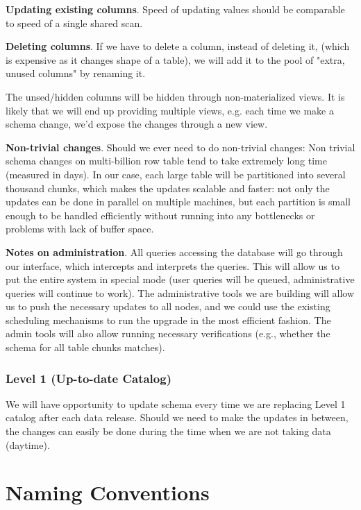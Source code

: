 \documentclass[DM,toc]{lsstdoc}
\begin{document}
\textbf{Updating existing columns}. Speed of updating values should be comparable to speed of a single shared scan.

\textbf{Deleting columns}. If we have to delete a column, instead of deleting it, (which is expensive as it changes shape of a table), we will add it to the pool of "extra, unused columns" by renaming it.

The unsed/hidden columns will be hidden through non-materialized views. It is likely that we will end up providing multiple views, e.g. each time we make a schema change, we'd expose the changes through a new view.

\textbf{Non-trivial changes}. Should we ever need to do non-trivial changes: Non trivial schema changes on multi-billion row table tend to take extremely long time (measured in days). In our case, each large table will be partitioned into several thousand chunks, which makes the updates scalable and faster: not only the updates can be done in parallel on multiple machines, but each partition is small enough to be handled efficiently without running into any bottlenecks or problems with lack of buffer space.

\textbf{Notes on administration}. All queries accessing the database will go through our interface, which intercepts and interprets the queries. This will allow us to put the entire system in special mode (user queries will be queued, administrative queries will continue to work). The administrative tools we are building will allow us to push the necessary updates to all nodes, and we could use the existing scheduling mechanisms to run the upgrade in the most efficient fashion. The admin tools will also allow running necessary verifications (e.g., whether the schema for all table chunks matches).

\subsubsection{Level 1 (Up-to-date Catalog)}

We will have opportunity to update schema every time we are replacing Level 1 catalog after each data release. Should we need to make the updates in between, the changes can easily be done during the time when we are not taking data (daytime).

\section{Naming Conventions}
\end{document}
